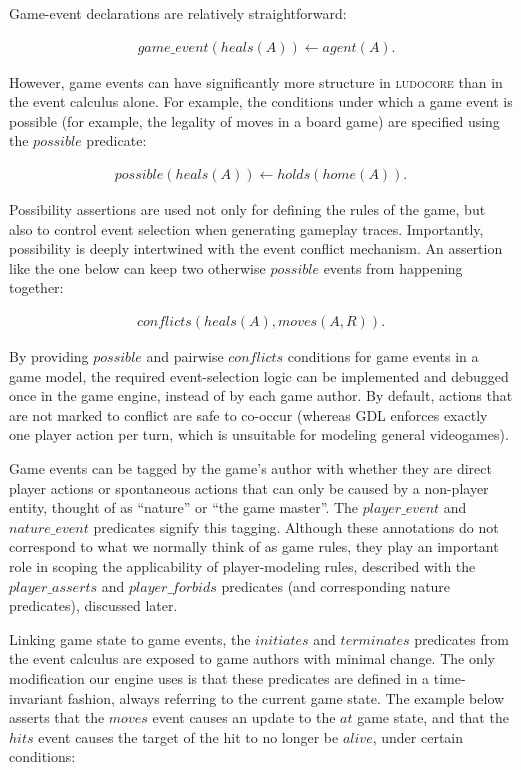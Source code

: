 \documentclass[letterpaper]{article}
\newcommand{\ludocore}{\textsc{ludocore}}
\newcommand{\snippet}[1]{{\vspace{-0.4cm}\footnotesize\begin{align*}#1\end{align*}\vspace{-0.4cm}}}
\newcommand{\logical}[1]{$#1$}
\begin{document}
Game-event declarations are relatively straightforward:

\snippet{&game\_event(heals(A)) \leftarrow agent(A).}

However, game events can have significantly more structure in \ludocore{} than in
the event calculus alone. For example, the conditions under which a game event
is possible (for example, the legality of moves in a board game) are specified
using the \logical{possible} predicate:

\snippet{possible(heals(A)) \leftarrow holds(home(A)).}

Possibility assertions are used not only for defining the rules of the game,
but also to control event selection when generating gameplay traces.  Importantly,
possibility is deeply intertwined with the event conflict mechanism.  An
assertion like the one below can keep two otherwise \logical{possible} events
from happening together:

\snippet{conflicts(heals(A), moves(A,R)).}

By providing \logical{possible} and pairwise \logical{conflicts} conditions for
game events in a game model, the required event-selection logic can be
implemented and debugged once in the game engine, instead of by each game
author. By default, actions that are not marked to conflict are safe to
co-occur (whereas GDL enforces exactly one player action per turn, which is
unsuitable for modeling general videogames).

Game events can be tagged by the game's author with whether they are direct
player actions or spontaneous actions that can only be caused by a non-player
entity, thought of as ``nature'' or ``the game master''. The
\logical{player\_event} and \logical{nature\_event} predicates signify this
tagging. Although these annotations do not correspond to what we normally think
of as game rules, they play an important role in scoping the applicability of
player-modeling rules, described with the \logical{player\_asserts} and
\logical{player\_forbids} predicates (and corresponding nature predicates),
discussed later.

Linking game state to game events, the \logical{initiates} and
\logical{terminates} predicates from the event calculus are exposed to game
authors with minimal change. The only modification our engine uses is that
these predicates are defined in a time-invariant fashion, always referring to
the current game state. The example below asserts that the \logical{moves}
event causes an update to the \logical{at} game state, and that the \logical{hits}
event causes the target of the hit to no longer be \logical{alive}, under
certain conditions:
\end{document}
